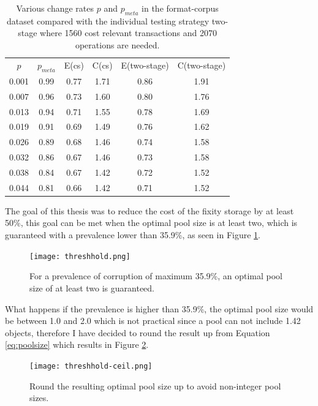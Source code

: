 \documentclass[final]{vutinfth}
\begin{document}
\begin{table}[t]
    \centering
    \begin{tabular}{c c c c c c}
        $p$ & $p_{meta}$ & E(\acrshort{cs}) & C(\acrshort{cs}) & E(\acrshort{two-stage}) & C(\acrshort{two-stage})\\
        0.001 &	0.99 & 0.77 & 1.71 & 0.86 & 1.91 \\
        0.007 &	0.96 & 0.73 & 1.60 & 0.80 & 1.76 \\
        0.013 &	0.94 & 0.71 & 1.55 & 0.78 & 1.69 \\
        0.019 &	0.91 & 0.69 & 1.49 & 0.76 & 1.62 \\
        0.026 &	0.89 & 0.68 & 1.46 & 0.74 & 1.58 \\
        0.032 &	0.86 & 0.67 & 1.46 & 0.73 & 1.58 \\
        0.038 &	0.84 & 0.67 & 1.42 & 0.72 & 1.52 \\
        0.044 &	0.81 & 0.66 & 1.42 & 0.71 & 1.52 
    \end{tabular}
    \caption{Various change rates $p$ and $p_{meta}$ in the format-corpus dataset compared with the individual testing strategy \acrshort{two-stage} where 1560 cost relevant transactions and 2070 operations are needed.}
    \label{tb:split-off}
\end{table}

The goal of this thesis was to reduce the cost of the fixity storage by at least 50\%, this goal can be met when the optimal pool size is at least two, which is guaranteed with a prevalence lower than 35.9\%, as seen in Figure \ref{fig:threshhold}.
\begin{figure}[tb]
    \caption{For a prevalence of corruption of maximum 35.9\%, an optimal pool size of at least two is guaranteed.}
    \label{fig:threshhold}
    \centering
    \texttt{[image: threshhold.png]}
\end{figure}
What happens if the prevalence is higher than 35.9\%, the optimal pool size would be between 1.0 and 2.0 which is not practical since a pool can not include 1.42 objects, therefore I have decided to round the result up from Equation \ref{eq:poolsize} which results in Figure \ref{fig:threshhold-ceil}.
\begin{figure}[tb]
    \caption{Round the resulting optimal pool size up to avoid non-integer pool sizes.}
    \label{fig:threshhold-ceil}
    \centering
    \texttt{[image: threshhold-ceil.png]}
\end{figure}
\end{document}
